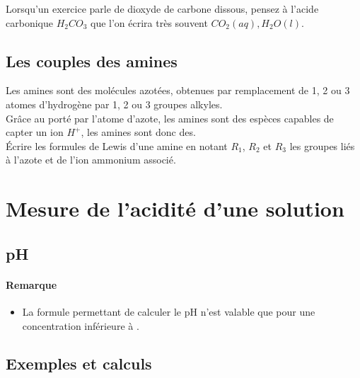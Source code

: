  Lorsqu'un exercice parle de dioxyde de carbone dissous, pensez à l'acide carbonique $H_2CO_3$ que l'on écrira très souvent  $CO_2(aq),H_2O(l)$.

\subsection{Les couples des amines}
Les amines sont des molécules azotées, obtenues par remplacement de 1, 2 ou 3 atomes d'hydrogène par 1, 2 ou 3 groupes alkyles.\\
Grâce au porté par l'atome d'azote, les amines sont des espèces capables de capter un ion $H^+$, les amines sont donc des.\\


Écrire les formules de Lewis d'une amine en notant $R_1$, $R_2$ et $R_3$ les groupes liés à l'azote et de l'ion ammonium associé.


\section{Mesure de l'acidité d'une solution}
\subsection{pH}


\paragraph*{Remarque} 
\begin{itemize}
 	\item La formule permettant de calculer le pH n'est valable que pour une concentration inférieure à .

\end{itemize}
\subsection{Exemples et calculs}

